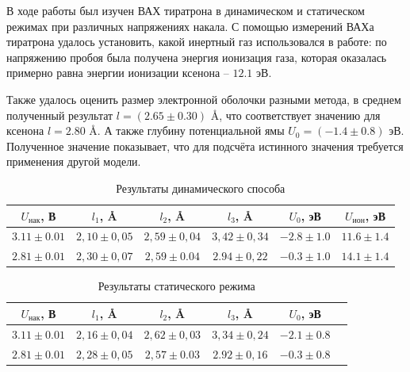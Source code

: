 	В ходе работы был изучен ВАХ тиратрона в динамическом и статическом режимах при различных напряжениях накала. 
    С помощью измерений ВАХа тиратрона удалось установить, какой инертный газ использовался в работе: 
    по напряжению пробоя была получена энергия ионизация газа, которая оказалась примерно равна энергии ионизации ксенона -- $12.1 \text{ эВ}$. 

    Также удалось оценить размер электронной оболочки разными метода, в среднем полученный результат $l = (2.65 \pm 0.30)$ \AA, что соответствует значению для ксенона $l = 2.80$ \AA. 
    А также глубину потенциальной ямы $U_0 = (- 1.4 \pm 0.8) \text{ эВ}$. Полученное значение показывает, что для подсчёта истинного значения требуется применения другой модели.

    \begin{table}[h!]
        \centering
        \begin{tabular}{|c|c|c|c|c|c|}
        \hline
        $U_{\text{нак}}$, В & $l_1$, \AA      & $l_2$, \AA      & $l_3$, \AA      & $U_0$, эВ & $U_{ион}$,  эВ \\ \hline
        $3.11 \pm 0.01$    & $2,10 \pm 0,05$ & $2,59 \pm 0,04$ & $3,42 \pm 0,34$ & $ -2.8 \pm 1.0 $ & $11.6 \pm 1.4$ \\ \hline
        $2.81 \pm 0.01$    & $2,30 \pm 0,07$ & $2,59 \pm 0.04$ & $2.94 \pm 0,22$ & $ -0.3 \pm 1.0 $  & $14.1 \pm 1.4$ \\ \hline
        \end{tabular}
        \caption{Результаты динамического способа}
    \end{table}

    \begin{table}[h!]
        \centering
        \begin{tabular}{|c|c|c|c|c|c|}
        \hline
        $U_{\text{нак}}$, В & $l_1$, \AA      & $l_2$, \AA      & $l_3$, \AA      & $U_0$, эВ  \\ \hline
        $3.11 \pm 0.01$    & $2,16 \pm 0,04$ & $2,62 \pm 0,03$ & $3,34 \pm 0,24$ & $ -2.1 \pm 0.8 $ \\ \hline
        $2.81 \pm 0.01$    & $2,28 \pm 0,05$ & $2,57 \pm 0.03$ & $2.92 \pm 0,16$ & $ -0.3 \pm 0.8 $  \\ \hline
        \end{tabular}
        \caption{Результаты статического режима}
    \end{table}


